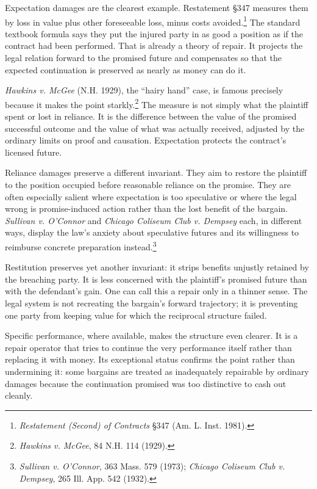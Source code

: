 \documentclass[11pt]{article}
\begin{document}
Expectation damages are the clearest example. Restatement \S 347 measures them by loss in value plus other foreseeable loss, minus costs avoided.\footnote{\textit{Restatement (Second) of Contracts} \S 347 (Am. L. Inst. 1981).} The standard textbook formula says they put the injured party in as good a position as if the contract had been performed. That is already a theory of repair. It projects the legal relation forward to the promised future and compensates so that the expected continuation is preserved as nearly as money can do it.

\textit{Hawkins v. McGee} (N.H. 1929), the ``hairy hand'' case, is famous precisely because it makes the point starkly.\footnote{\textit{Hawkins v. McGee}, 84 N.H. 114 (1929).} The measure is not simply what the plaintiff spent or lost in reliance. It is the difference between the value of the promised successful outcome and the value of what was actually received, adjusted by the ordinary limits on proof and causation. Expectation protects the contract's licensed future.

Reliance damages preserve a different invariant. They aim to restore the plaintiff to the position occupied before reasonable reliance on the promise. They are often especially salient where expectation is too speculative or where the legal wrong is promise-induced action rather than the lost benefit of the bargain. \textit{Sullivan v. O'Connor} and \textit{Chicago Coliseum Club v. Dempsey} each, in different ways, display the law's anxiety about speculative futures and its willingness to reimburse concrete preparation instead.\footnote{\textit{Sullivan v. O'Connor}, 363 Mass. 579 (1973); \textit{Chicago Coliseum Club v. Dempsey}, 265 Ill. App. 542 (1932).}

Restitution preserves yet another invariant: it strips benefits unjustly retained by the breaching party. It is less concerned with the plaintiff's promised future than with the defendant's gain. One can call this a repair only in a thinner sense. The legal system is not recreating the bargain's forward trajectory; it is preventing one party from keeping value for which the reciprocal structure failed.

Specific performance, where available, makes the structure even clearer. It is a repair operator that tries to continue the very performance itself rather than replacing it with money. Its exceptional status confirms the point rather than undermining it: some bargains are treated as inadequately repairable by ordinary damages because the continuation promised was too distinctive to cash out cleanly.
\end{document}
